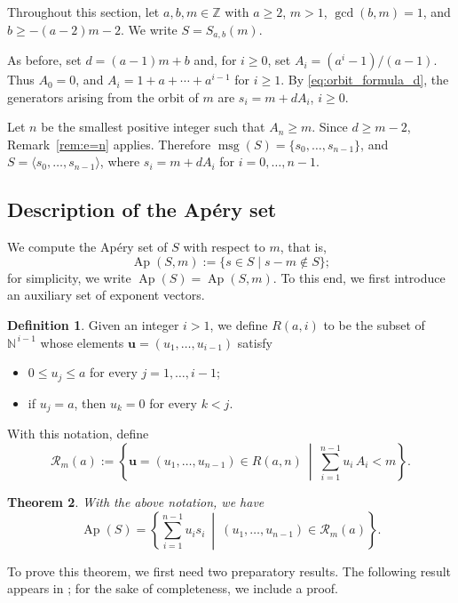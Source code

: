 \documentclass[12pt,a4paper]{amsart}
\newtheorem{theorem}{Theorem}[section]
\theoremstyle{definition}
\newtheorem{definition}[theorem]{Definition}
\begin{document}
Throughout this section, let $a,b,m\in\mathbb{Z}$ with $a\ge 2$,
$m>1$, $\gcd(b,m)=1$, and $b\ge -(a-2)m-2$. We write
$S=S_{a,b}(m)$.

As before, set $d=(a-1)m+b$ and, for $i\ge 0$, set
$A_i=(a^i-1)/(a-1)$. Thus $A_0=0$, and
$A_i=1+a+\cdots+a^{i-1}$ for $i\ge 1$. By
\eqref{eq:orbit_formula_d}, the generators arising from the orbit of
$m$ are $s_i=m+dA_i$, $i\ge 0$.

Let $n$ be the smallest positive integer such that $A_n\ge m$. Since
$d\ge m-2$, Remark~\ref{rem:e=n} applies. Therefore
$\operatorname{msg}(S)=\{s_0,\ldots,s_{n-1}\}$, and
$S=\langle s_0,\ldots,s_{n-1}\rangle$, where
$s_i=m+dA_i$ for $i=0,\ldots,n-1$. 

\subsection{Description of the Ap\'ery set}

We compute the Ap\'ery set of $S$ with respect to $m$, that is,
\[
\operatorname{Ap}(S,m):=\{s\in S \mid s-m\notin S\};
\] 
for simplicity, we write $\operatorname{Ap}(S)=\operatorname{Ap}(S,m)$. To this end, we first introduce an auxiliary set of exponent vectors.

\begin{definition}\label{def:conj_R}
Given an integer $i>1$, we define $R(a,i)$ to be the subset of $\mathbb{N}^{\,i-1}$ whose elements
$\mathbf{u}=(u_1,\ldots,u_{i-1})$ satisfy
\begin{itemize}
\item[(a)] $0\le u_j\le a$ for every $j=1,\ldots,i-1$;
\item[(b)] if $u_j=a$, then $u_k=0$ for every $k<j$.
\end{itemize}
\end{definition}

With this notation, define
\[
\mathcal{R}_m(a):=\left\{\mathbf{u}=(u_1,\ldots,u_{n-1})\in R(a,n)\ \middle|\ \sum_{i=1}^{n-1} u_i\,A_i < m\right\}.
\]

\begin{theorem}\label{Th:Ap}
With the above notation, we have
\[
\operatorname{Ap}(S)=\left\{\sum_{i=1}^{n-1} u_i s_i\ \middle|\ (u_1,\ldots,u_{n-1})\in \mathcal{R}_m(a)\right\}.
\]
\end{theorem}

To prove this theorem, we first need two preparatory results. The following result appears in \cite[Theorem~3.4]{Ugo17}; for the sake
of completeness, we include a proof.
\end{document}
